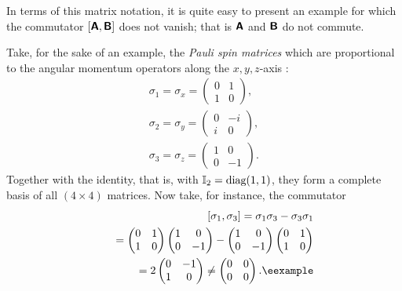 {\color{blue}
\bexample
In terms of this matrix notation, it is quite easy to present an example
for which the commutator
$
[\textsf{\textbf{A}}, \textsf{\textbf{B}} ]
$
does not vanish; that is
$\textsf{\textbf{A}}$  and $\textsf{\textbf{B}}$
do not commute.

Take, for the sake of an example, the
{\em Pauli spin matrices}
which are proportional to the angular momentum operators along the $x,y,z$-axis
\cite{schiff-55}:
\begin{equation}
\begin{split}
\sigma_1=\sigma_x
=
\begin{pmatrix}
0&1\\
1&0
\end{pmatrix}
,   \\
\sigma_2=\sigma_y
=
\begin{pmatrix}
0&-i\\
i&0
\end{pmatrix}
,   \\
\sigma_3=\sigma_z
=
\begin{pmatrix}
1&0\\
0&-1
\end{pmatrix}
.
\end{split}
\end{equation}
Together with the identity, that is, with ${\Bbb I}_2=\textrm{diag}(1,1)$,
they form a complete basis of all $(4\times 4)$ matrices.
Now take, for instance, the commutator
\begin{equation}
\begin{split}
[\sigma_1,\sigma_3]= \sigma_1\sigma_3-\sigma_3\sigma_1\\
\qquad
=
\begin{pmatrix}
0&1\\
1&0
\end{pmatrix}
\begin{pmatrix}
1&0\\
0&-1
\end{pmatrix}
-
\begin{pmatrix}
1&0\\
0&-1
\end{pmatrix}
\begin{pmatrix}
0&1\\
1&0
\end{pmatrix}
\\
\qquad
=  2
\begin{pmatrix}
0&-1\\
1&0
\end{pmatrix}
\neq
\begin{pmatrix}
0&0\\
0&0
\end{pmatrix}
.    \textrm{\eexample}
\end{split}
\end{equation}
}

